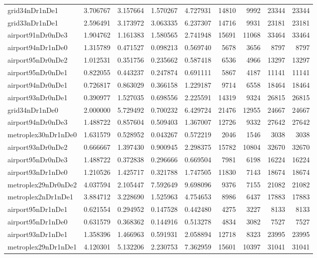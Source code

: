 \begin{longtable}{|l|r|r|r|r|r|r|r|r|}
grid34nDr1nDe1 & 3.706767 & 3.157664 & 1.570267 & 4.727931 & 14810 & 9992 & 23344 & 23344 \\
grid33nDr1nDe1 & 2.596491 & 3.173972 & 3.063335 & 6.237307 & 14716 & 9931 & 23181 & 23181 \\
airport91nDr0nDe3 & 1.904762 & 1.161383 & 1.580565 & 2.741948 & 15691 & 11068 & 33464 & 33464 \\
airport94nDr1nDe0 & 1.315789 & 0.471527 & 0.098213 & 0.569740 & 5678 & 3656 & 8797 & 8797 \\
airport95nDr0nDe2 & 1.012531 & 0.351756 & 0.235662 & 0.587418 & 6536 & 4966 & 13297 & 13297 \\
airport95nDr0nDe1 & 0.822055 & 0.443237 & 0.247874 & 0.691111 & 5867 & 4187 & 11141 & 11141 \\
airport94nDr0nDe1 & 0.726817 & 0.863029 & 0.366158 & 1.229187 & 9714 & 6558 & 18464 & 18464 \\
airport93nDr0nDe1 & 0.390977 & 1.527035 & 0.698556 & 2.225591 & 14319 & 9324 & 26815 & 26815 \\
grid34nDr1nDe0 & 2.000000 & 5.729492 & 0.700232 & 6.429724 & 21476 & 12955 & 24667 & 24667 \\
airport94nDr0nDe3 & 1.488722 & 0.857604 & 0.509403 & 1.367007 & 12726 & 9332 & 27642 & 27642 \\
metroplex30nDr1nDe0 & 1.631579 & 0.528952 & 0.043267 & 0.572219 & 2046 & 1546 & 3038 & 3038 \\
airport93nDr0nDe2 & 0.666667 & 1.397430 & 0.900945 & 2.298375 & 15782 & 10804 & 32670 & 32670 \\
airport95nDr0nDe3 & 1.488722 & 0.372838 & 0.296666 & 0.669504 & 7981 & 6198 & 16224 & 16224 \\
airport93nDr1nDe0 & 1.210526 & 1.425717 & 0.321788 & 1.747505 & 11830 & 7143 & 18674 & 18674 \\
metroplex29nDr0nDe2 & 4.037594 & 2.105447 & 7.592649 & 9.698096 & 9376 & 7155 & 21082 & 21082 \\
metroplex2nDr1nDe1 & 3.884712 & 3.228690 & 1.525963 & 4.754653 & 8986 & 6437 & 17883 & 17883 \\
airport95nDr1nDe1 & 0.621554 & 0.294952 & 0.147528 & 0.442480 & 4275 & 3227 & 8133 & 8133 \\
airport95nDr1nDe0 & 0.631579 & 0.368362 & 0.144916 & 0.513278 & 4834 & 3082 & 7527 & 7527 \\
airport93nDr1nDe1 & 1.358396 & 1.466963 & 0.591931 & 2.058894 & 12718 & 8323 & 23995 & 23995 \\
metroplex29nDr1nDe1 & 4.120301 & 5.132206 & 2.230753 & 7.362959 & 15601 & 10397 & 31041 & 31041 \\

\end{longtable}
